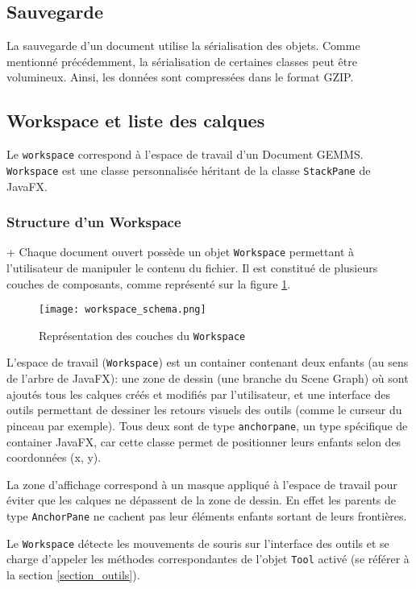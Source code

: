 \subsection{Sauvegarde}
La sauvegarde d'un document utilise la sérialisation des objets. Comme mentionné précédemment, la sérialisation de certaines classes peut être volumineux. Ainsi, les données sont compressées dans le format GZIP.

\subsection{Workspace et liste des calques}
Le \texttt{\gls{workspace}} correspond à l'espace de travail d'un Document GEMMS. \texttt{Workspace} est une classe personnalisée héritant de la classe \texttt{StackPane} de JavaFX. 

\subsubsection{Structure d'un Workspace}
+\label{sec:structure_workspace}
Chaque document ouvert possède un objet \texttt{Workspace} permettant à l'utilisateur de manipuler le contenu du fichier. Il est constitué de plusieurs couches de composants, comme représenté sur la figure \ref{fig:workspace_representation}.


\begin{figure}[!ht]
	\caption{Représentation des couches du \texttt{Workspace}}
	\centering
	\texttt{[image: workspace\_schema.png]}
	\label{fig:workspace_representation}
\end{figure}

L'espace de travail (\texttt{Workspace}) est un container contenant deux enfants (au sens de l'arbre de JavaFX): une zone de dessin (une branche du Scene Graph) où sont ajoutés tous les calques créés et modifiés par l'utilisateur, et une interface des outils permettant de dessiner les retours visuels des outils (comme le curseur du pinceau par exemple). Tous deux sont de type \texttt{\gls{anchorpane}}, un type spécifique de container JavaFX, car cette classe permet de positionner leurs enfants selon des coordonnées (x, y).

La zone d'affichage correspond à un masque appliqué à l'espace de travail pour éviter que les calques ne dépassent de la zone de dessin. En effet les parents de type \texttt{AnchorPane} ne cachent pas leur éléments enfants sortant de leurs frontières.

Le \texttt{Workspace} détecte les mouvements de souris sur l'interface des outils et se charge d'appeler les méthodes correspondantes de l'objet \texttt{Tool} activé (se référer à la section \ref{section_outils}).

